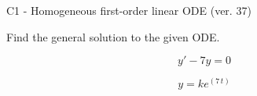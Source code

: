 \begin{exercise}
  \begin{exerciseTitle}C1 - Homogeneous first-order linear ODE (ver. 37)\end{exerciseTitle}
  \begin{exerciseStatement}
    
Find the general solution to the given ODE.

    
\[y'-7y=0\]

  \end{exerciseStatement}
  \begin{exerciseAnswer}
    
\[y= k e^{\left(7 \, t\right)}\]

  \end{exerciseAnswer}
\end{exercise}